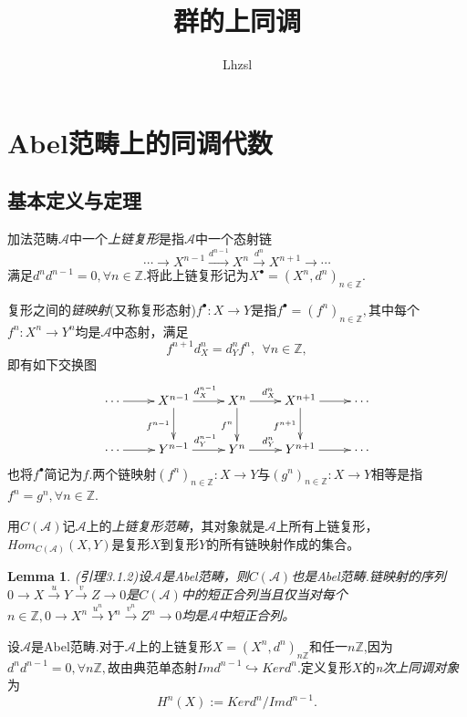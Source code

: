 \documentclass[UTF8]{article}
\title{\textbf{\huge{群的上同调}}}
\author{Lhzsl}
\date{}
\newtheorem{lem}{Lemma}[section]
\begin{document}
	\maketitle
	\tableofcontents
	\newpage
	\section{Abel范畴上的同调代数}
	\subsection{基本定义与定理}
	加法范畴$\mathcal{A}$中一个\emph{上链复形}是指$\mathcal{A}$中一个态射链
	$$
	\cdots\rightarrow X^{n-1}\stackrel{d^{n-1}}{\rightarrow} X^{n}\stackrel{d^{n}}{\rightarrow}X^{n+1}\rightarrow \cdots
	$$
	满足$d^{n}d^{n-1}=0,\forall n\in \mathbb{Z}$.将此上链复形记为$X^{\bullet}=(X^{n},d^{n})_{n\in \mathbb{Z}}.$
	
	复形之间的\emph{链映射}(又称复形态射)$f^{\bullet}:X\rightarrow Y$是指$f^{\bullet}=(f^{n})_{n\in \mathbb{Z}},$其中每个$f^{n}:X^{n}\rightarrow Y^{n}$均是$\mathcal{A}$中态射，满足
		$$
		f^{n+1}d_{X}^{n}=d_{Y}^{n}f^{n},\ \ \forall n\in \mathbb{Z},
		$$
		即有如下交换图
$$
\xymatrix{
	\cdots \ar[r]&X^{n-1}\ar[r]^{d_{X}^{n-1}}\ar[d]_{f^{n-1}}&X^{n}\ar[r]^{d_{X}^{n}}\ar[d]_{f^{n}}&X^{n+1}\ar[r]\ar[d]_{f^{n+1}}&\cdots \\
	\cdots\ar[r]&Y^{n-1}\ar[r]^{d_{Y}^{n-1}}&Y^{n}\ar[r]^{d_{Y}^{n}}&Y^{n+1}\ar[r]&\cdots
}
$$
也将$f^{\bullet}$简记为$f$.两个链映射$(f^{n})_{n\in \mathbb{Z}}:X\rightarrow Y$与$(g^{n})_{n\in \mathbb{Z}}:X\rightarrow Y$相等是指$f^{n}=g^{n},\forall n\in \mathbb{Z}$.

用$C(\mathcal{A})$记$\mathcal{A}$上的\emph{上链复形范畴}，其对象就是$\mathcal{A}$上所有上链复形，$Hom_{C(\mathcal{A})}(X,Y)$是复形$X$到复形$Y$的所有链映射作成的集合。
\begin{lem}
	(\cite{zh}引理3.1.2)设$\mathcal{A}$是Abel范畴，则$C(\mathcal{A})$也是Abel范畴.链映射的序列$0\rightarrow X\stackrel{u}{\rightarrow}Y\stackrel{v}{\rightarrow}Z\rightarrow 0$是$C(\mathcal{A})$中的短正合列当且仅当对每个$n\in \mathbb{Z},0\rightarrow X^{n}\stackrel{u^{n}}{\rightarrow}Y^{n}\stackrel{v^{n}}{\rightarrow}Z^{n}\rightarrow 0$均是$\mathcal{A}$中短正合列。
\end{lem}
 
 设$\mathcal{A}$是Abel范畴.对于$\mathcal{A}$上的上链复形$X=(X^{n},d^{n})_{n\mathbb{Z}}$和任一$n\mathbb{Z}$,因为$d^{n}d^{n-1}=0,\forall n\mathbb{Z},$故由典范单态射$Imd^{n-1}\hookrightarrow Kerd^{n}$.定义复形$X$的\emph{n次上同调对象}为
 $$
 H^{n}(X):=Kerd^{n}/Imd^{n-1}.
 $$
 
\end{document}
